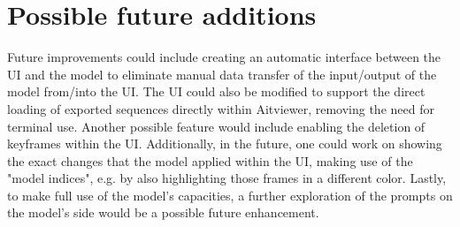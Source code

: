 \documentclass[a4paper]{scrartcl}
\begin{document}
\section*{Possible future additions}
Future improvements could include creating an automatic interface between the UI and the model to eliminate manual data transfer of the input/output of the model from/into the UI. The UI could also be modified to support the direct loading of exported sequences directly within Aitviewer, removing the need for terminal use. Another possible feature would include enabling the deletion of keyframes within the UI. Additionally, in the future, one could work on showing the exact changes that the model applied within the UI, making use of the "model indices", e.g. by also highlighting those frames in a different color. Lastly, to make full use of the model's capacities, a further exploration of the prompts on the model's side would be a possible future enhancement.
\end{document}
